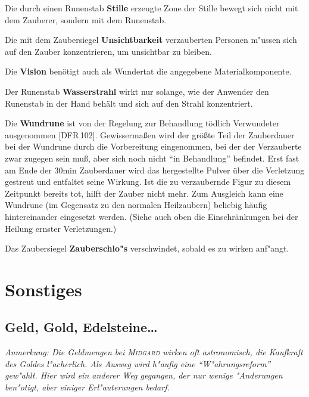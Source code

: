 \documentclass[10pt,a4paper,germanpar]{article}
\begin{document}
Die durch einen Runenstab \textbf{Stille} erzeugte Zone der Stille
bewegt sich nicht mit dem Zauberer, sondern mit dem Runenstab.

%

Die mit dem Zaubersiegel \textbf{Unsichtbarkeit} verzauberten Personen 
m"ussen sich auf den Zauber konzentrieren, um unsichtbar zu bleiben.

Die \textbf{Vision} benötigt auch als Wundertat die angegebene
Materialkomponente.

Der Runenstab \textbf{Wasserstrahl} wirkt nur solange, wie der
Anwender den Runenstab in der Hand behält und sich auf den Strahl
konzentriert.

Die \textbf{Wundrune} ist von der Regelung zur Behandlung tödlich
Verwundeter ausgenommen [DFR\,102]. Gewissermaßen wird der größte Teil
der Zauberdauer bei der Wundrune durch die Vorbereitung eingenommen,
bei der der Verzauberte zwar zugegen sein muß, aber sich noch nicht
"`in Behandlung"' befindet. Erst fast am Ende der 30min Zauberdauer
wird das hergestellte Pulver über die Verletzung gestreut und
entfaltet seine Wirkung. Ist die zu verzaubernde Figur zu diesem
Zeitpunkt bereits tot, hilft der Zauber nicht mehr. Zum Ausgleich kann
eine Wundrune (im Gegensatz zu den normalen Heilzaubern) beliebig
häufig hintereinander eingesetzt werden. (Siehe auch oben die
Einschränkungen bei der Heilung ernster Verletzungen.)

Das Zaubersiegel \textbf{Zauberschlo"s} verschwindet, sobald es zu
wirken anf"angt.

\section{Sonstiges}

\subsection{Geld, Gold, Edelsteine\dots}

\emph{Anmerkung: Die Geldmengen bei \textsc{Midgard} wirken oft
  astronomisch, die Kaufkraft des Goldes l"acherlich. Als Ausweg wird
  h"aufig eine "`W"ahrungsreform"' gew"ahlt. Hier wird ein anderer Weg
  gegangen, der nur wenige "Anderungen ben"otigt, aber einiger
  Erl"auterungen bedarf.}
\end{document}
